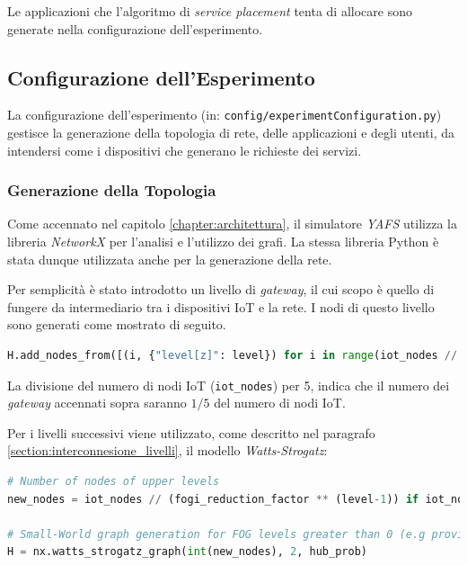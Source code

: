 Le applicazioni che l'algoritmo di \textit{service placement} tenta di allocare sono generate nella configurazione dell'esperimento.

\subsection{Configurazione dell'Esperimento}

La configurazione dell'esperimento (in: \texttt{config/experimentConfiguration.py}) gestisce la generazione della topologia di rete, delle applicazioni e degli utenti, da intendersi come i dispositivi che generano le richieste dei servizi.

\subsubsection{Generazione della Topologia}

Come accennato nel capitolo \ref{chapter:architettura}, il simulatore \textit{YAFS} utilizza la libreria \textit{NetworkX} per l'analisi e l'utilizzo dei grafi. La stessa libreria Python è stata dunque utilizzata anche per la generazione della rete.

Per semplicità è stato introdotto un livello di \textit{gateway}, il cui scopo è quello di fungere da intermediario tra i dispositivi IoT e la rete. I nodi di questo livello sono generati come mostrato di seguito.

\begin{lstlisting}[language=python]
H.add_nodes_from([(i, {"level[z]": level}) for i in range(iot_nodes // 5)])
\end{lstlisting}

La divisione del numero di nodi IoT (\texttt{iot\_nodes}) per 5, indica che il numero dei \textit{gateway} accennati sopra saranno $1 / 5$ del numero di nodi IoT.

Per i livelli successivi viene utilizzato, come descritto nel paragrafo \ref{section:interconnesione_livelli}, il modello \textit{Watts-Strogatz}:
\begin{lstlisting}[language=python]
# Number of nodes of upper levels
new_nodes = iot_nodes // (fogi_reduction_factor ** (level-1)) if iot_nodes // (fogi_reduction_factor**(level-1)) >= 2 else 2
                
# Small-World graph generation for FOG levels greater than 0 (e.g provincial fog nodes)
H = nx.watts_strogatz_graph(int(new_nodes), 2, hub_prob)
\end{lstlisting}

